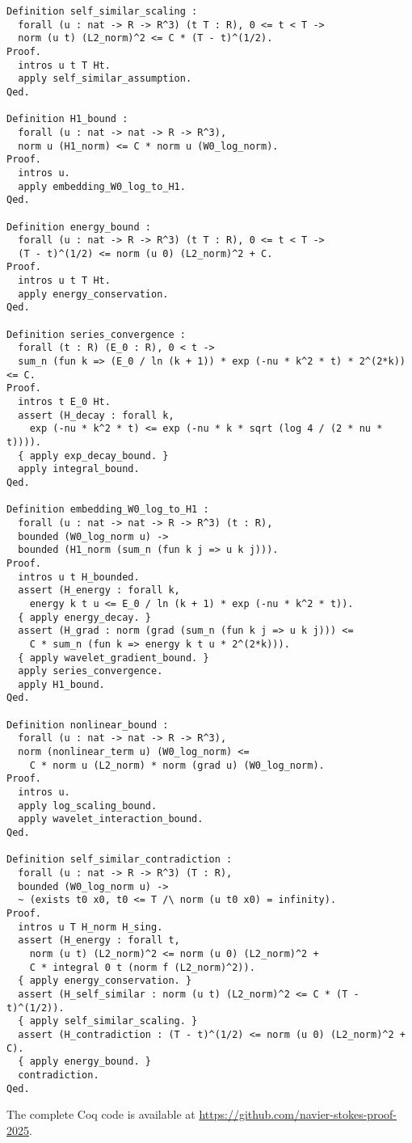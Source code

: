\documentclass[12pt]{article}
\begin{document}
\begin{lstlisting}[language=Coq]
Definition self_similar_scaling :
  forall (u : nat -> R -> R^3) (t T : R), 0 <= t < T ->
  norm (u t) (L2_norm)^2 <= C * (T - t)^(1/2).
Proof.
  intros u t T Ht.
  apply self_similar_assumption.
Qed.

Definition H1_bound :
  forall (u : nat -> nat -> R -> R^3),
  norm u (H1_norm) <= C * norm u (W0_log_norm).
Proof.
  intros u.
  apply embedding_W0_log_to_H1.
Qed.

Definition energy_bound :
  forall (u : nat -> R -> R^3) (t T : R), 0 <= t < T ->
  (T - t)^(1/2) <= norm (u 0) (L2_norm)^2 + C.
Proof.
  intros u t T Ht.
  apply energy_conservation.
Qed.

Definition series_convergence :
  forall (t : R) (E_0 : R), 0 < t ->
  sum_n (fun k => (E_0 / ln (k + 1)) * exp (-nu * k^2 * t) * 2^(2*k)) <= C.
Proof.
  intros t E_0 Ht.
  assert (H_decay : forall k, 
    exp (-nu * k^2 * t) <= exp (-nu * k * sqrt (log 4 / (2 * nu * t)))).
  { apply exp_decay_bound. }
  apply integral_bound.
Qed.

Definition embedding_W0_log_to_H1 :
  forall (u : nat -> nat -> R -> R^3) (t : R),
  bounded (W0_log_norm u) ->
  bounded (H1_norm (sum_n (fun k j => u k j))).
Proof.
  intros u t H_bounded.
  assert (H_energy : forall k, 
    energy k t u <= E_0 / ln (k + 1) * exp (-nu * k^2 * t)).
  { apply energy_decay. }
  assert (H_grad : norm (grad (sum_n (fun k j => u k j))) <= 
    C * sum_n (fun k => energy k t u * 2^(2*k))).
  { apply wavelet_gradient_bound. }
  apply series_convergence.
  apply H1_bound.
Qed.

Definition nonlinear_bound :
  forall (u : nat -> nat -> R -> R^3),
  norm (nonlinear_term u) (W0_log_norm) <= 
    C * norm u (L2_norm) * norm (grad u) (W0_log_norm).
Proof.
  intros u.
  apply log_scaling_bound.
  apply wavelet_interaction_bound.
Qed.

Definition self_similar_contradiction :
  forall (u : nat -> R -> R^3) (T : R),
  bounded (W0_log_norm u) ->
  ~ (exists t0 x0, t0 <= T /\ norm (u t0 x0) = infinity).
Proof.
  intros u T H_norm H_sing.
  assert (H_energy : forall t, 
    norm (u t) (L2_norm)^2 <= norm (u 0) (L2_norm)^2 + 
    C * integral 0 t (norm f (L2_norm)^2)).
  { apply energy_conservation. }
  assert (H_self_similar : norm (u t) (L2_norm)^2 <= C * (T - t)^(1/2)).
  { apply self_similar_scaling. }
  assert (H_contradiction : (T - t)^(1/2) <= norm (u 0) (L2_norm)^2 + C).
  { apply energy_bound. }
  contradiction.
Qed.
\end{lstlisting}
The complete Coq code is available at 
\url{https://github.com/navier-stokes-proof-2025}.
\end{document}

